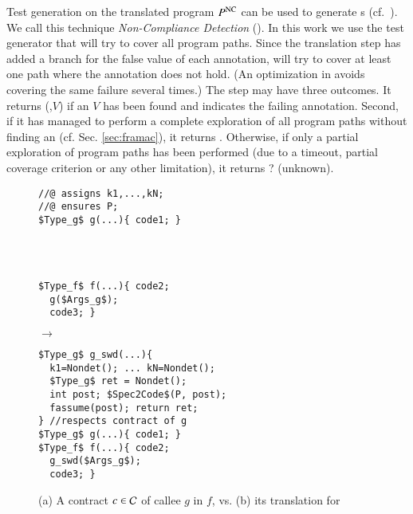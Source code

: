 Test generation on the translated program $P^{\mathrm{NC}}$ 
can be used to generate \NCCE{}s (cf.~\cite{Petiot/SCAM14}).
We call this technique \emph{Non-Compliance Detection} (\NCD).
In this work we use the \pathcrawler test generator that
will try to cover all program paths.
Since the translation step has added a branch for the false
value of each annotation, \pathcrawler will try to cover at
least one path where the annotation does not hold.
(An optimization in \pathcrawler avoids covering the 
same \fassert failure several times.)
The \NCD step may have three outcomes. 
It returns (\nc,$V$) if an \NCCE $V$ has been found and
indicates the failing annotation.
Second, if it has managed to perform a complete exploration 
of all program paths without finding an \NCCE (cf. Sec. \ref{sec:framac}), it returns \no.
Otherwise, if only a partial exploration of program paths
has been performed (due to a timeout,
partial coverage criterion or any other limitation), it returns 
\textsf{?} (unknown).


\begin{figure}[tb]
\begin{minipage}{0.4\columnwidth}
\begin{lstlisting}[mathescape]
//@ assigns k1,...,kN;
//@ ensures P;
$Type_g$ g(...){ code1; }




$Type_f$ f(...){ code2;
  g($Args_g$);
  code3; }
\end{lstlisting}
\end{minipage}
\hspace{-6mm}
\begin{minipage}{0.07\columnwidth}$\to$\end{minipage}
\begin{minipage}{0.6\columnwidth}
\begin{lstlisting}[mathescape]
$Type_g$ g_swd(...){
  k1=Nondet(); ... kN=Nondet();
  $Type_g$ ret = Nondet();
  int post; $Spec2Code$(P, post);
  fassume(post); return ret;
} //respects contract of g
$Type_g$ g(...){ code1; }
$Type_f$ f(...){ code2;
  g_swd($Args_g$);
  code3; }
\end{lstlisting}
\end{minipage}
\caption{(a) A contract $c\in{\ensuremath\mathcal{C}}$ of callee $g$ in $f$, vs. (b) its translation
for \CWD}
\label{fig:CW-transf-functions}
\end{figure}



